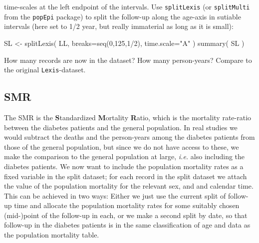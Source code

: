 \begin{enumerate}
  time-scales at the left endpoint of the intervals.
  Use \texttt{splitLexis} (or \texttt{splitMulti} from the
  \texttt{popEpi} package) to split the follow-up along the
  age-axis in sutiable intervals (here set to 1/2 year, but really
  immaterial as long as it is small):
\begin{Schunk}
\begin{Sinput}
 SL <- splitLexis( LL, breaks=seq(0,125,1/2), time.scale="A" )
 summary( SL )
\end{Sinput}
\end{Schunk}
  How many records are now in the dataset? How many person-years?
  Compare to the original \texttt{Lexis}-dataset.
\end{enumerate}
\subsection*{SMR}
The SMR is the \textbf{S}tandardized \textbf{M}ortality
\textbf{R}atio, which is the mortality rate-ratio between the diabetes
patients and the general population.  In real studies we would
subtract the deaths and the person-years among the diabetes patients
from those of the general population, but since we do not have access
to these, we make the comparison to the general population at large,
\textit{i.e.} also including the diabetes patients.
We now want to include the population mortality rates as a fixed
variable in the split dataset; for each record in the split dataset we
attach the value of the population mortality for the relevant sex, and
and calendar time.
This can be achieved in two ways: Either we just use the current split
of follow-up time and allocate the population mortality rates for some
suitably chosen (mid-)point of the follow-up in each, or we make a
second split by date, so that follow-up in the diabetes patients is in
the same classification of age and data as the population mortality
table.
